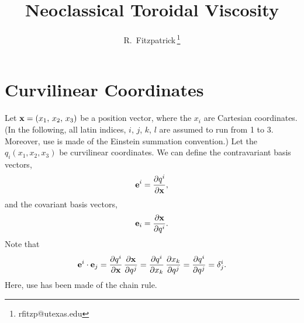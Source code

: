 \documentclass[12pt,prb,aps,notitlepage]{revtex4-1}
\begin{document}
\title{Neoclassical Toroidal Viscosity}
\author{R.~Fitzpatrick\,\footnote{rfitzp@utexas.edu}}
\begin{abstract}
\end{abstract}
\maketitle

\section{Curvilinear Coordinates}
Let ${\bf x}=(x_1,\,x_2,\,x_3)$ be a position vector, where the $x_i$ are Cartesian coordinates.  (In the following, all latin indices, $i$, $j$, $k$, $l$ are assumed to run from 1 to 3. Moreover,
use is made of the Einstein summation convention.)
Let the $q_i(x_1,x_2,x_3)$ be curvilinear coordinates. We can define the contravariant basis vectors,
\begin{equation}\label{e1}
{\bf e}^i = \frac{\partial q^i}{\partial {\bf x}},
\end{equation}
and the covariant basis vectors, 
\begin{equation}\label{e2}
{\bf e}_i = \frac{\partial {\bf x}}{\partial q^i}.
\end{equation}
Note that
\begin{equation}\label{e3}
{\bf e}^i\cdot{\bf e}_j = \frac{\partial q^i}{\partial {\bf x}}\,\frac{\partial {\bf x}}{\partial q^j}= \frac{\partial q^i}{\partial x_k}\,\frac{\partial x_k}{\partial q^j}=
\frac{\partial q^i}{\partial q^j} = \delta^i_j.
\end{equation}
Here, use has been made of the chain rule. 
\end{document}
